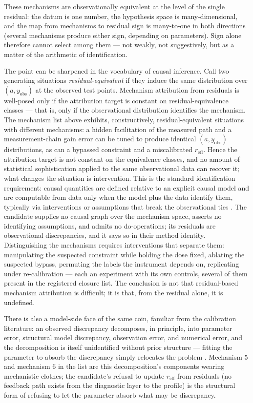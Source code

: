These mechanisms are observationally equivalent at the level of the
single residual: the datum is one number, the hypothesis space is many-dimensional,
and the map from mechanisms to residual sign is many-to-one in both
directions (several mechanisms produce either sign, depending on
parameters). Sign alone therefore cannot select among them --- not
weakly, not suggestively, but as a matter of the arithmetic of
identification.

The point can be sharpened in the vocabulary of causal inference. Call
two generating situations \emph{residual-equivalent} if they induce the
same distribution over $(a, y_{\mathrm{obs}})$ at the observed test
points. Mechanism attribution from residuals is well-posed only if the
attribution target is constant on residual-equivalence classes --- that
is, only if the observational distribution identifies the mechanism.
The mechanism list above exhibits, constructively, residual-equivalent
situations with different mechanisms: a hidden facilitation of the
measured path and a measurement-chain gain error can be tuned to
produce identical $(a, y_{\mathrm{obs}})$ distributions, as can a
bypassed constraint and a miscalibrated $r_{\mathrm{eff}}$. Hence the
attribution target is not constant on the equivalence classes, and no
amount of statistical sophistication applied to the same observational
data can recover it; what changes the situation is intervention. This
is the standard identification requirement: causal quantities are
defined relative to an explicit causal model and are computable from
data only when the model plus the data identify them, typically via
interventions or assumptions that break the observational ties
\cite{pearl}. The candidate supplies no causal graph over the mechanism
space, asserts no identifying assumptions, and admits no
do-operations; its residuals are observational discrepancies, and it
says so in their method identity. Distinguishing the mechanisms
requires interventions that separate them: manipulating the suspected
constraint while holding the dose fixed, ablating the suspected bypass,
permuting the labels the instrument depends on, replicating under
re-calibration --- each an experiment with its own controls, several of
them present in the registered closure list. The conclusion is not that
residual-based mechanism attribution is difficult; it is that, from the
residual alone, it is undefined.

There is also a model-side face of the same coin, familiar from the
calibration literature: an observed discrepancy decomposes, in
principle, into parameter error, structural model discrepancy,
observation error, and numerical error, and the decomposition is itself
unidentified without prior structure --- fitting the parameter to absorb
the discrepancy simply relocates the problem \cite{kennedyohagan}.
Mechanism 5 and mechanism 6 in the list are this decomposition's
components wearing mechanistic clothes; the candidate's refusal to
update $r_{\mathrm{eff}}$ from residuals (no feedback path exists from
the diagnostic layer to the profile) is the structural form of refusing
to let the parameter absorb what may be discrepancy.


